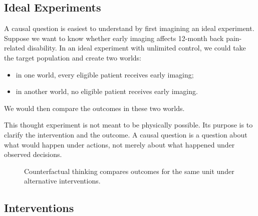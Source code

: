 \label{lec:2-5}

\subsection{Ideal Experiments}

A causal question is easiest to understand by first imagining an ideal experiment. Suppose we want to know whether early imaging affects 12-month back pain-related disability. In an ideal experiment with unlimited control, we could take the target population and create two worlds:
\begin{itemize}
  \item in one world, every eligible patient receives early imaging;
  \item in another world, no eligible patient receives early imaging.
\end{itemize}
We would then compare the outcomes in these two worlds.

This thought experiment is not meant to be physically possible. Its purpose is to clarify the intervention and the outcome. A causal question is a question about what would happen under actions, not merely about what happened under observed decisions.

\begin{figure}[H]
\centering
{}
\caption{Counterfactual thinking compares outcomes for the same unit under alternative interventions.}
\end{figure}

\subsection{Interventions}

